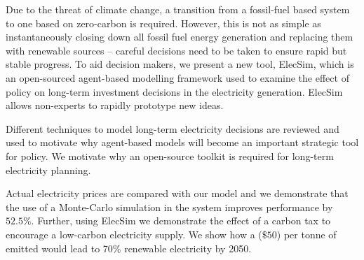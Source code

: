 Due to the threat of climate change, a transition from a fossil-fuel based system to one based on zero-carbon is required. However, this is not as simple as instantaneously closing down all fossil fuel energy generation and replacing them with renewable sources -- careful decisions need to be taken to ensure rapid but stable progress. To aid decision makers, we present a new tool, ElecSim, which is an open-sourced agent-based modelling framework used to examine the effect of policy on long-term investment decisions in the electricity generation. ElecSim allows non-experts to rapidly prototype new ideas. %

Different techniques to model long-term electricity decisions are reviewed and used to motivate why agent-based models will become an important strategic tool for policy. We motivate why an open-source toolkit is required for long-term electricity planning.

Actual electricity prices are compared with our model and we demonstrate that the use of a Monte-Carlo simulation in the system improves performance by $52.5\%$. Further, using ElecSim we demonstrate the effect of a carbon tax to encourage a low-carbon electricity supply. We show how a  ($\$50$) per tonne of  emitted would lead to 70\% renewable electricity by 2050. 
